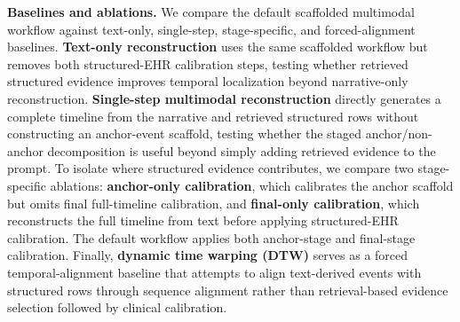 \textbf{Baselines and ablations.} We compare the default scaffolded multimodal workflow against text-only, single-step, stage-specific, and forced-alignment baselines. \textbf{Text-only reconstruction} uses the same scaffolded workflow but removes both structured-EHR calibration steps, testing whether retrieved structured evidence improves temporal localization beyond narrative-only reconstruction. \textbf{Single-step multimodal reconstruction} directly generates a complete timeline from the narrative and retrieved structured rows without constructing an anchor-event scaffold, testing whether the staged anchor/non-anchor decomposition is useful beyond simply adding retrieved evidence to the prompt. To isolate where structured evidence contributes, we compare two stage-specific ablations: \textbf{anchor-only calibration}, which calibrates the anchor scaffold but omits final full-timeline calibration, and \textbf{final-only calibration}, which reconstructs the full timeline from text before applying structured-EHR calibration. The default workflow applies both anchor-stage and final-stage calibration. Finally, \textbf{dynamic time warping (DTW)} serves as a forced temporal-alignment baseline that attempts to align text-derived events with structured rows through sequence alignment rather than retrieval-based evidence selection followed by clinical calibration.


